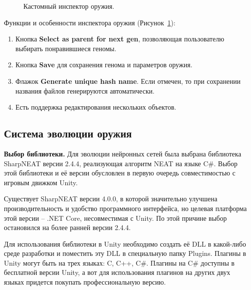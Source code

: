 \vspace{5mm}

\begin{figure}[ht]
    \begin{center}

        \caption{
            \label{SavingWeapon}
            Кастомный инспектор оружия.}
    \end {center}
\end {figure}

{\parindent0pt Функции и особенности инспектора оружия (Рисунок~\ref{SavingWeapon}):}
\begin{enumerate}[label=\textbullet]
    \item Кнопка {\small \textbf{Select as parent for next gen}}, позволяющая пользователю выбирать понравившиеся геномы.
    \item Кнопка {\small \textbf{Save}} для сохранения генома и параметров оружия.
    \item Флажок {\small \textbf{Generate unique hash name}}. Если отмечен, то при сохранении названия файлов генерируются автоматически.
    \item Есть поддержка редактирования нескольких объектов.
\end{enumerate}


\subsection{Система эволюции оружия}

\textbf{Выбор библиотеки.} Для эволюции нейронных сетей была выбрана библиотека SharpNEAT\cite{s8} версии 2.4.4, реализующая алгоритм NEAT на языке C\#. Выбор этой библиотеки и её версии обусловлен в первую очередь совместимостью с игровым движком Unity.

Существует SharpNEAT версии 4.0.0, в которой значительно улучшена производительность и удобство программного интерфейса, но целевая платформа этой версии -- .NET Core, несовместимая с Unity. По этой причине выбор остановился на более ранней версии 2.4.4.

Для использования библиотеки в Unity необходимо создать её DLL в какой-либо среде разработки и поместить эту DLL в специальную папку \flqq Plugins\frqq. Плагины в Unity могут быть на трех языках: C, C++, C\#. Плагины на C\# доступны в бесплатной версии Unity, а вот для использования плагинов на других двух языках придется покупать профессиональную версию.




